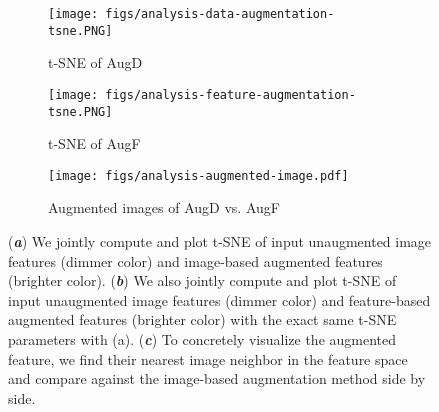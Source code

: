 \documentclass[runningheads]{llncs}
\begin{document}
\begin{figure}[t]
\centering
\begin{subfigure}{0.51\textwidth}
  \centering
  \texttt{[image: figs/analysis-data-augmentation-tsne.PNG]}
  \caption{t-SNE of AugD}
  \label{fig:analysis-data-augmentation-tsne}
\end{subfigure}
\begin{subfigure}{0.44\textwidth}
  \centering
  \texttt{[image: figs/analysis-feature-augmentation-tsne.PNG]}
  \caption{t-SNE of AugF}
  \label{fig:analysis-feature-augmentation-tsne}
\end{subfigure}

\begin{subfigure}{0.9\textwidth}
  \centering
  \texttt{[image: figs/analysis-augmented-image.pdf]}
  \caption{Augmented images of AugD vs. AugF}
  \label{fig:analysis-augmented-image}
\end{subfigure}
\caption{
(\textit{\textbf{a}}) We jointly compute and plot t-SNE of input unaugmented image features (dimmer color) and image-based augmented features (brighter color).
(\textit{\textbf{b}}) We also jointly compute and plot t-SNE of input unaugmented image features (dimmer color) and feature-based augmented features (brighter color) with the exact same t-SNE parameters with (a).
(\textit{\textbf{c}}) To concretely visualize the augmented feature, we find their nearest image neighbor in the feature space and compare against the image-based augmentation method side by side.
}
\label{fig:analysis-augmentation}
\end{figure}
\end{document}
